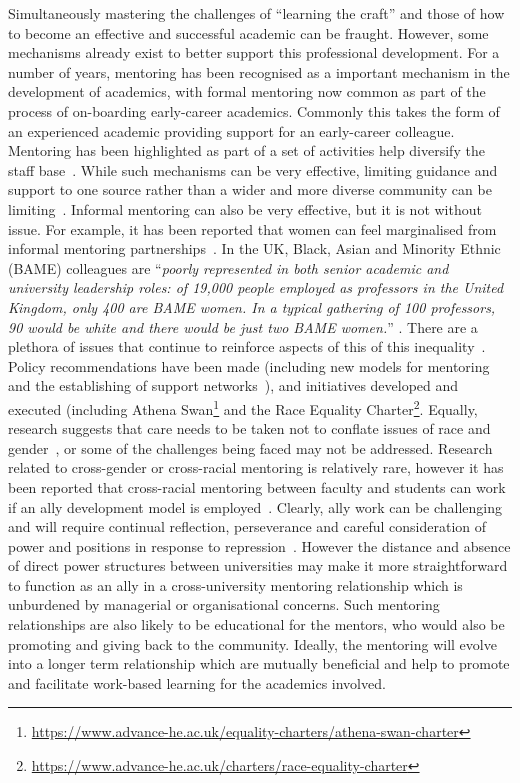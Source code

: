 \documentclass[sigconf]{acmart}
\begin{document}
Simultaneously mastering the challenges of ``learning the craft''
and those of how to become an effective and successful academic can be
fraught. However, some mechanisms already exist to better support this
professional development. For a number of years, mentoring has been
recognised as a important mechanism in the development of academics,
with formal mentoring now common as part of the process of on-boarding
early-career academics. Commonly this takes the form of an experienced
academic providing support for an early-career colleague. Mentoring
has been highlighted as part of a set of activities help diversify the
staff base~\cite{Golubchik2018}. While such mechanisms can be very
effective, limiting guidance and support to one source rather than a
wider and more diverse community can be
limiting~\cite{deJanasz}. Informal mentoring can also be very
effective, but it is not without issue. For example, it has been
reported that women can feel marginalised from informal mentoring
partnerships~\cite{gibson2006mentoring}. In the UK, Black, Asian and
Minority Ethnic (BAME) colleagues are ``\emph{poorly represented in
both senior academic and university leadership roles: of 19,000 people
employed as professors in the United Kingdom, only 400 are BAME
women. In a typical gathering of 100 professors, 90 would be white and
there would be just two BAME women.}''
\cite[p.~I]{UniversitiesUK19}. There are a plethora of issues that
continue to reinforce aspects of this of this
inequality~\cite{arday20}. Policy recommendations have been made
(including new models for mentoring and the establishing of support
networks~\cite{bhopal2014experiences}), and initiatives developed and
executed (including Athena
Swan\footnote{\url{https://www.advance-he.ac.uk/equality-charters/athena-swan-charter}}
and
the Race Equality Charter\footnote{\url{
    https://www.advance-he.ac.uk/charters/race-equality-charter}}. Equally,
research suggests that care needs to be taken not to conflate issues
of race and gender~\cite{Bhopal19}, or some of the challenges being
faced may not be addressed. Research related to cross-gender or
cross-racial mentoring is relatively rare, however it has been
reported that cross-racial mentoring between faculty and students can
work if an ally development model is
employed~\cite{reddick2016don}. Clearly, ally work can be challenging and
will require continual reflection, perseverance and careful
consideration of power and positions in response to
repression~\cite{Patton2015}. However the distance and absence of
direct power structures between universities may make it more
straightforward to function as an ally in a cross-university mentoring
relationship which is unburdened by managerial or organisational
concerns. Such mentoring relationships are also likely to be
educational for the mentors, who would also be promoting and giving
back to the community. Ideally, the mentoring will evolve into a
longer term relationship which are mutually beneficial and help to
promote and facilitate work-based learning for the academics involved.
\end{document}
